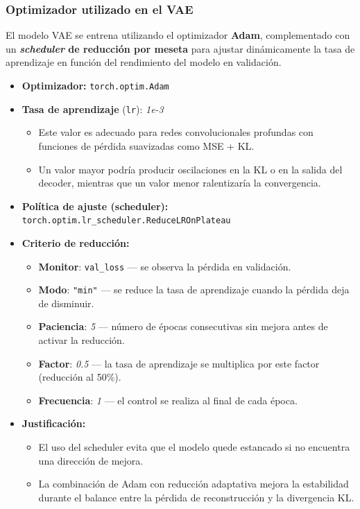 \subsubsection*{Optimizador utilizado en el VAE}

El modelo VAE se entrena utilizando el optimizador \textbf{Adam}, complementado con un \textbf{\emph{scheduler} de reducción por meseta} para ajustar dinámicamente la tasa de aprendizaje en función del rendimiento del modelo en validación.

\begin{itemize}
    \item \textbf{Optimizador:} \texttt{torch.optim.Adam}
    \item \textbf{Tasa de aprendizaje} (\texttt{lr}): \textit{1e-3}
    \begin{itemize}
        \item Este valor es adecuado para redes convolucionales profundas con funciones de pérdida suavizadas como MSE + KL.
        \item Un valor mayor podría producir oscilaciones en la KL o en la salida del decoder, mientras que un valor menor ralentizaría la convergencia.
    \end{itemize}

    \item \textbf{Política de ajuste (scheduler):} \texttt{torch.optim.lr\_scheduler.ReduceLROnPlateau}
    \item \textbf{Criterio de reducción:}
    \begin{itemize}
        \item \textbf{Monitor}: \texttt{val\_loss} — se observa la pérdida en validación.
        \item \textbf{Modo}: \texttt{"min"} — se reduce la tasa de aprendizaje cuando la pérdida deja de disminuir.
        \item \textbf{Paciencia}: \textit{5} — número de épocas consecutivas sin mejora antes de activar la reducción.
        \item \textbf{Factor}: \textit{0.5} — la tasa de aprendizaje se multiplica por este factor (reducción al 50\%).
        \item \textbf{Frecuencia}: \textit{1} — el control se realiza al final de cada época.
    \end{itemize}

    \item \textbf{Justificación:}
    \begin{itemize}
        \item El uso del scheduler evita que el modelo quede estancado si no encuentra una dirección de mejora.
        \item La combinación de Adam con reducción adaptativa mejora la estabilidad durante el balance entre la pérdida de reconstrucción y la divergencia KL.
    \end{itemize}
\end{itemize}

